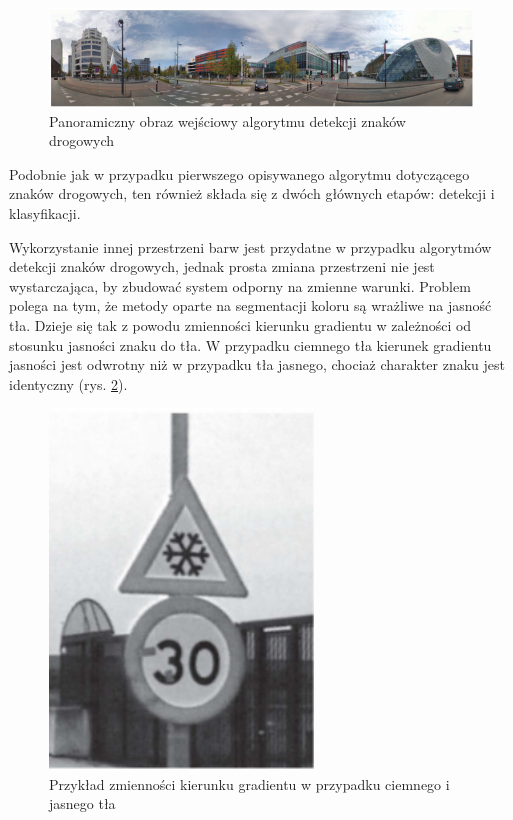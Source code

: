 \begin{figure}
  \centering
  \includegraphics[width=13cm]{img/sign_detection2_input.png}
  \caption{Panoramiczny obraz wejściowy algorytmu detekcji znaków drogowych\cite{T7}}
  \label{fig:sign_detection2_input}
\end{figure}

Podobnie jak w przypadku pierwszego opisywanego algorytmu dotyczącego znaków drogowych, ten również składa się z dwóch głównych etapów: detekcji i klasyfikacji.

Wykorzystanie innej przestrzeni barw jest przydatne w przypadku algorytmów detekcji znaków drogowych, jednak prosta zmiana przestrzeni nie jest wystarczająca, by zbudować system odporny na zmienne warunki.
Problem polega na tym, że metody oparte na segmentacji koloru są wrażliwe na jasność tła. 
Dzieje się tak z powodu zmienności kierunku gradientu w zależności od stosunku jasności znaku do tła. 
W przypadku ciemnego tła kierunek gradientu jasności jest odwrotny niż w przypadku tła jasnego, chociaż charakter znaku jest identyczny (rys. \ref{fig:sign_detection2_example}).

\begin{figure}
  \centering
  \includegraphics[width=7cm]{img/sign_detection2_example.png}
  \caption{Przykład zmienności kierunku gradientu w przypadku ciemnego i jasnego tła\cite{T7}}
  \label{fig:sign_detection2_example}
\end{figure}

